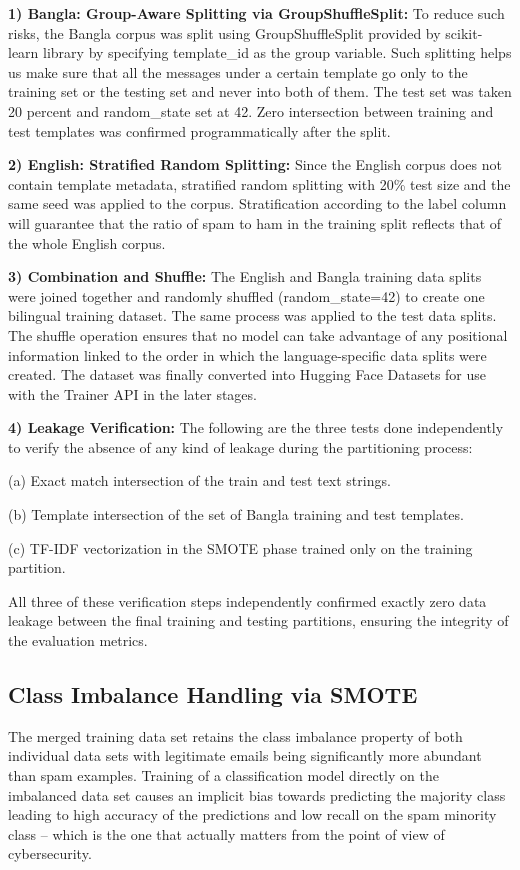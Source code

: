 \documentclass[journal]{IEEEtran}
\begin{document}
\textbf{1) Bangla: Group-Aware Splitting via GroupShuffleSplit:} To reduce
such risks, the Bangla corpus was split using GroupShuffleSplit provided
by scikit-learn library by specifying template\_id as the group variable.
Such splitting helps us make sure that all the messages under a certain
template go only to the training set or the testing set and never into
both of them. The test set was taken 20 percent and random\_state set at
42. Zero intersection between training and test templates was confirmed
programmatically after the split.

\textbf{2) English: Stratified Random Splitting:} Since the English corpus
does not contain template metadata, stratified random splitting with 20\%
test size and the same seed was applied to the corpus. Stratification
according to the label column will guarantee that the ratio of spam to
ham in the training split reflects that of the whole English corpus.

\textbf{3) Combination and Shuffle:} The English and Bangla training data
splits were joined together and randomly shuffled (random\_state=42) to
create one bilingual training dataset. The same process was applied to
the test data splits. The shuffle operation ensures that no model can
take advantage of any positional information linked to the order in
which the language-specific data splits were created. The dataset was
finally converted into Hugging Face Datasets for use with the Trainer
API in the later stages.

\textbf{4) Leakage Verification:} The following are the three tests done
independently to verify the absence of any kind of leakage during the
partitioning process:

(a) Exact match intersection of the train and test text strings.

(b) Template intersection of the set of Bangla training and test
templates.

(c) TF-IDF vectorization in the SMOTE phase trained only on the
training partition.

All three of these verification steps independently confirmed exactly zero data leakage between the final training and testing partitions, ensuring the integrity of the evaluation metrics.

\subsection{Class Imbalance Handling via SMOTE}

The merged training data set retains the class imbalance property of
both individual data sets with legitimate emails being significantly
more abundant than spam examples. Training of a classification model
directly on the imbalanced data set causes an implicit bias towards
predicting the majority class leading to high accuracy of the
predictions and low recall on the spam minority class -- which is the
one that actually matters from the point of view of cybersecurity.
\end{document}
